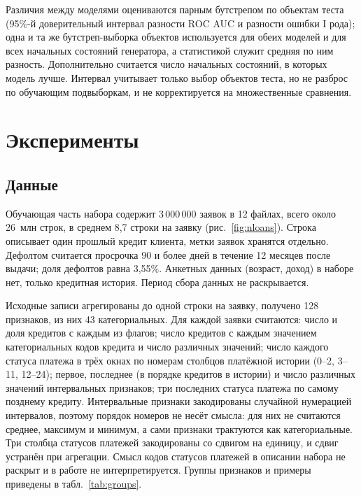 \documentclass{misisarticle}
\begin{document}
Различия между моделями оцениваются парным бутстрепом по объектам теста (95\%-й доверительный интервал разности ROC AUC и разности ошибки I рода); одна и та же бутстреп-выборка объектов используется для обеих моделей и для всех начальных состояний генератора, а статистикой служит средняя по ним разность. Дополнительно считается число начальных состояний, в которых модель лучше. Интервал учитывает только выбор объектов теста, но не разброс по обучающим подвыборкам, и не корректируется на множественные сравнения.

\section{Эксперименты}
\label{sec:exp}

\subsection{Данные}

Обучающая часть набора содержит 3\,000\,000 заявок в 12 файлах, всего около 26~млн строк, в среднем 8,7 строки на заявку (рис.~\ref{fig:nloans}). Строка описывает один прошлый кредит клиента, метки заявок хранятся отдельно. Дефолтом считается просрочка 90 и более дней в течение 12 месяцев после выдачи; доля дефолтов равна 3,55\%. Анкетных данных (возраст, доход) в наборе нет, только кредитная история. Период сбора данных не раскрывается.

Исходные записи агрегированы до одной строки на заявку, получено 128 признаков, из них 43 категориальных. Для каждой заявки считаются: число и доля кредитов с каждым из флагов; число кредитов с каждым значением категориальных кодов кредита и число различных значений; число каждого статуса платежа в трёх окнах по номерам столбцов платёжной истории (0--2, 3--11, 12--24); первое, последнее (в порядке кредитов в истории) и число различных значений интервальных признаков; три последних статуса платежа по самому позднему кредиту. Интервальные признаки закодированы случайной нумерацией интервалов, поэтому порядок номеров не несёт смысла: для них не считаются среднее, максимум и минимум, а сами признаки трактуются как категориальные. Три столбца статусов платежей закодированы со сдвигом на единицу, и сдвиг устранён при агрегации. Смысл кодов статусов платежей в описании набора не раскрыт и в работе не интерпретируется. Группы признаков и примеры приведены в табл.~\ref{tab:groups}.
\end{document}
